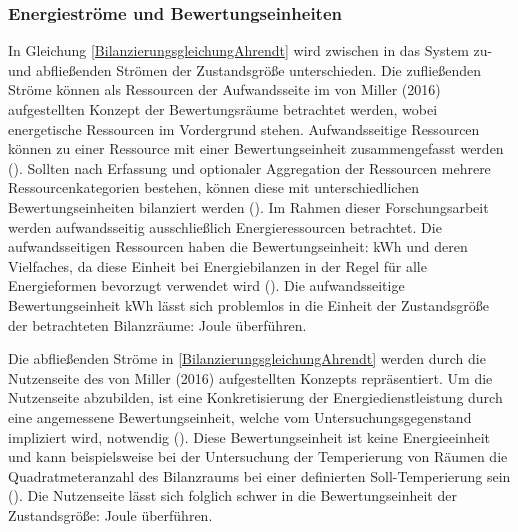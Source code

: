 
\subsubsection{Energieströme und Bewertungseinheiten}

In Gleichung \eqref{BilanzierungsgleichungAhrendt} wird zwischen in das System zu- und abfließenden Strömen der Zustandsgröße unterschieden.
Die zufließenden Ströme können als Ressourcen der Aufwandsseite im von Miller (2016) aufgestellten Konzept der Bewertungsräume 
betrachtet werden, wobei energetische Ressourcen im Vordergrund stehen. Aufwandsseitige Ressourcen können zu einer Ressource mit 
einer Bewertungseinheit zusammengefasst werden (\cite[S. 112]{Miller.2016}). Sollten nach Erfassung und optionaler Aggregation der 
Ressourcen mehrere Ressourcenkategorien bestehen, können diese mit unterschiedlichen Bewertungseinheiten bilanziert werden (\cite[S. 112]{Miller.2016}). 
Im Rahmen dieser Forschungsarbeit werden aufwandsseitig ausschließlich Energieressourcen betrachtet.
Die aufwandsseitigen Ressourcen haben die Bewertungseinheit: kWh und deren Vielfaches, da diese Einheit bei Energiebilanzen in der Regel 
für alle Energieformen bevorzugt verwendet wird (\cite[S. 65]{Konstantin.2023}). Die aufwandsseitige Bewertungseinheit kWh lässt sich problemlos in 
die Einheit der Zustandsgröße der betrachteten Bilanzräume: Joule überführen.

Die abfließenden Ströme in \eqref{BilanzierungsgleichungAhrendt} werden durch die Nutzenseite des von Miller (2016) aufgestellten Konzepts repräsentiert.
Um die Nutzenseite abzubilden, ist eine Konkretisierung der Energiedienstleistung durch eine angemessene Bewertungseinheit, welche vom Untersuchungsgegenstand 
impliziert wird, notwendig (\cite{Miller.2016}). Diese Bewertungseinheit ist keine Energieeinheit und kann beispielsweise bei der Untersuchung der Temperierung 
von Räumen die Quadratmeteranzahl des Bilanzraums bei einer definierten Soll-Temperierung sein (\cite{Miller.2016}). Die Nutzenseite lässt sich folglich schwer 
in die Bewertungseinheit der Zustandsgröße: Joule überführen.


